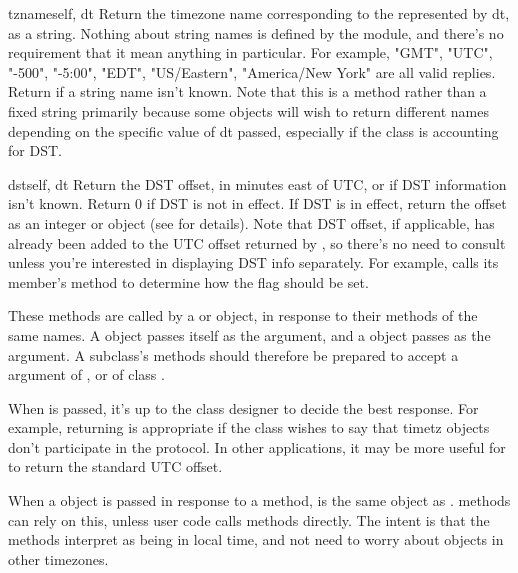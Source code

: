 \begin{methoddesc}{tzname}{self, dt}
    Return the timezone name corresponding to the  represented
    by dt, as a string.  Nothing about string names is defined by the
     module, and there's no requirement that it mean anything
    in particular.  For example, "GMT", "UTC", "-500", "-5:00", "EDT",
    "US/Eastern", "America/New York" are all valid replies.  Return
     if a string name isn't known.  Note that this is a method
    rather than a fixed string primarily because some  objects
    will wish to return different names depending on the specific value
    of dt passed, especially if the  class is accounting for DST.
\end{methoddesc}

\begin{methoddesc}{dst}{self, dt}
    Return the DST offset, in minutes east of UTC, or  if
    DST information isn't known.  Return 0 if DST is not in effect.
    If DST is in effect, return the offset as an integer or
     object (see  for details).
    Note that DST offset, if applicable, has
    already been added to the UTC offset returned by
    , so there's no need to consult 
    unless you're interested in displaying DST info separately.  For
    example,  calls its 
    member's  method to determine how the
     flag should be set.
\end{methoddesc}

These methods are called by a  or  object,
in response to their methods of the same names.  A 
object passes itself as the argument, and a  object passes
 as the argument.  A  subclass's methods should
therefore be prepared to accept a  argument of , or of
class .

When  is passed, it's up to the class designer to decide the
best response.  For example, returning  is appropriate if the
class wishes to say that timetz objects don't participate in the
 protocol.  In other applications, it may be more useful
for  to return the standard UTC offset.

When a  object is passed in response to a
 method,  is the same object as
.   methods can rely on this, unless
user code calls  methods directly.  The intent is that
the  methods interpret  as being in local time,
and not need to worry about objects in other timezones.


